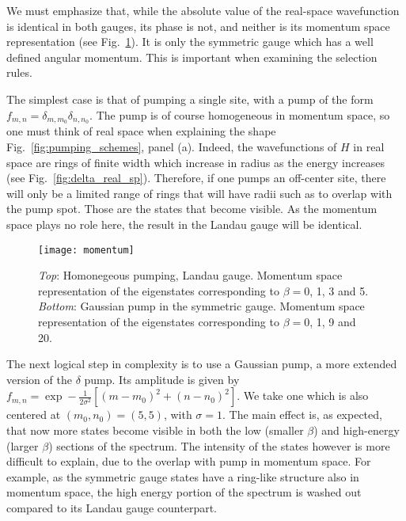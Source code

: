 \documentclass[twocolumn, 10pt, aps, superscriptaddress, floatfix, showpacs, prb, citeautoscript]{revtex4-1}
\newcommand{\co}[2]{#2}
\renewcommand{\paragraph}{\co}
\begin{document}
We must emphasize that, while the absolute value of the real-space
wavefunction is identical in both gauges, its phase is not, and
neither is its momentum space representation (see
Fig.~\ref{fig:hom_mom_sp}). It is only the symmetric gauge which has a
well defined angular momentum. This is important when examining the
selection rules.

\paragraph{A δ pump in real space is homogeneous in momentum space.}
The simplest case is that of pumping a single site, with a pump of the
form $f_{m,n} = \delta_{m,m_0} \delta_{n,n_0}$. The pump is of course
homogeneous in momentum space, so one must think of real space when
explaining the shape Fig.~\ref{fig:pumping_schemes}, panel (a).
Indeed, the wavefunctions of $H$ in real space are rings of finite
width which increase in radius as the energy increases (see
Fig.~\ref{fig:delta_real_sp}). Therefore, if one pumps an off-center
site, there will only be a limited range of rings that will have radii
such as to overlap with the pump spot. Those are the states that
become visible. As the momentum space plays no role here, the result
in the Landau gauge will be identical.
%
\begin{figure}[htb]\centering
  \texttt{[image: momentum]}
  \caption{\emph{Top}: Homonegeous pumping, Landau gauge. Momentum
    space representation of the eigenstates corresponding to
    $\beta=0$, 1, 3 and 5.  
    \emph{Bottom}: Gaussian pump in the
    symmetric gauge. Momentum space representation of the eigenstates
    corresponding to $\beta=0$, 1, 9 and 20.}
  \label{fig:hom_mom_sp}
\end{figure}


\paragraph{Gaussian pumping is now bound also in momentum space.}
The next logical step in complexity is to use a Gaussian pump, a more
extended version of the $\delta$ pump. Its amplitude is given by
$f_{m,n} = \exp- \frac{1}{2\sigma^2} \left[(m-m_0)^2 + (n-n_0)^2
\right]$.
We take one which is also centered at $(m_0,n_0) = (5,5)$, with
$\sigma =1$. The main effect is, as expected, that now more states
become visible in both the low (smaller $\beta$) and high-energy
(larger $\beta$) sections of the spectrum. The intensity of the states
however is more difficult to explain, due to the overlap with pump in
momentum space. For example, as the symmetric gauge states have a
ring-like structure also in momentum space, the high energy portion of
the spectrum is washed out compared to its Landau gauge counterpart.
\end{document}
